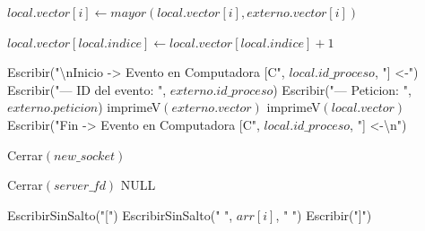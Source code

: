 \begin{tcolorbox}[colback=white, colframe=azul_unam, title=Pseudocódigo: cnx\_vectores.c (Conexión P2P Vectorial), breakable]
\begin{algorithmic}[1]
        \Else {}
            
                \State $local.vector[i] \gets mayor(local.vector[i], externo.vector[i])$ 
            \EndFor
            
            \State $local.vector[local.indice] \gets local.vector[local.indice] + 1$ 
            
        \EndIf

        \State Escribir("\textbackslash nInicio -> Evento en Computadora [C", $local.id\_proceso$, "] <-")
        \State Escribir("--- ID del evento: ", $externo.id\_proceso$)
        \State Escribir("--- Peticion: ", $externo.peticion$)
        \State imprimeV$(externo.vector)$
        \State imprimeV$(local.vector)$
        \State Escribir("Fin -> Evento en Computadora [C", $local.id\_proceso$, "] <-\textbackslash n")

        \State Cerrar$(new\_socket)$

    \EndWhile

    \State Cerrar$(server\_fd)$
    \State \Return NULL

\EndProcedure

\vspace{0.3cm}


    \State EscribirSinSalto("[")
        \State EscribirSinSalto(" ", $arr[i]$, " ")
    \EndFor
    \State Escribir("]")
\EndProcedure

\end{algorithmic}
\end{tcolorbox}